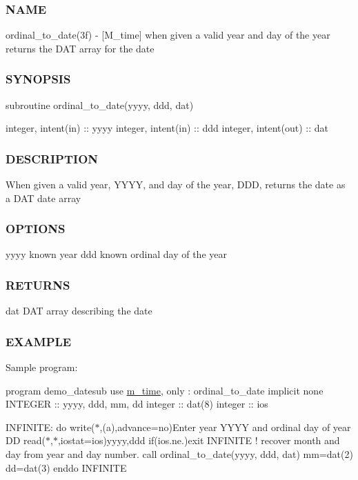 \begin{DoxyVerb}
\subsubsection*{N\+A\+ME}

ordinal\+\_\+to\+\_\+date(3f) -\/ \mbox{[}M\+\_\+time\mbox{]} when given a valid year and day of the year returns the D\+AT array for the date \subsubsection*{S\+Y\+N\+O\+P\+S\+IS}

subroutine ordinal\+\_\+to\+\_\+date(yyyy, ddd, dat)

integer, intent(in) \+:\+: yyyy integer, intent(in) \+:\+: ddd integer, intent(out) \+:\+: dat \subsubsection*{D\+E\+S\+C\+R\+I\+P\+T\+I\+ON}

When given a valid year, Y\+Y\+YY, and day of the year, D\+DD, returns the date as a D\+AT date array \subsubsection*{O\+P\+T\+I\+O\+NS}

yyyy known year ddd known ordinal day of the year \subsubsection*{R\+E\+T\+U\+R\+NS}

dat D\+AT array describing the date \subsubsection*{E\+X\+A\+M\+P\+LE}

Sample program\+:

program demo\+\_\+datesub use \hyperlink{namespacem__time}{m\+\_\+time}, only \+: ordinal\+\_\+to\+\_\+date implicit none I\+N\+T\+E\+G\+ER \+:\+: yyyy, ddd, mm, dd integer \+:\+: dat(8) integer \+:\+: ios

I\+N\+F\+I\+N\+I\+TE\+: do write($\ast$,\textquotesingle{}(a)\textquotesingle{},advance=\textquotesingle{}no\textquotesingle{})\textquotesingle{}Enter year Y\+Y\+YY and ordinal day of year DD \textquotesingle{} read($\ast$,$\ast$,iostat=ios)yyyy,ddd if(ios.\+ne.)exit I\+N\+F\+I\+N\+I\+TE ! recover month and day from year and day number. call ordinal\+\_\+to\+\_\+date(yyyy, ddd, dat) mm=dat(2) dd=dat(3) enddo I\+N\+F\+I\+N\+I\+TE


\end{DoxyVerb}
